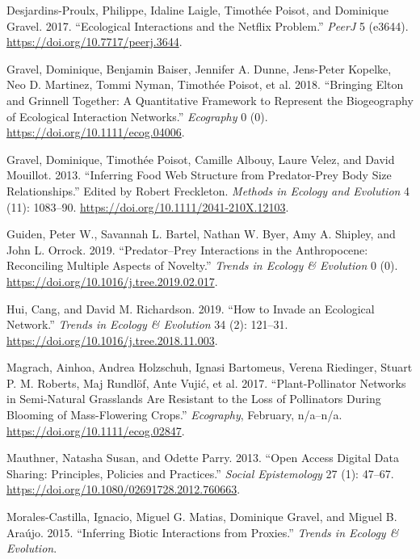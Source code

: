 \leavevmode\hypertarget{ref-DesjLaig17}{}%
Desjardins-Proulx, Philippe, Idaline Laigle, Timothée Poisot, and
Dominique Gravel. 2017. ``Ecological Interactions and the Netflix
Problem.'' \emph{PeerJ} 5 (e3644).
\url{https://doi.org/10.7717/peerj.3644}.

\leavevmode\hypertarget{ref-GravBais18}{}%
Gravel, Dominique, Benjamin Baiser, Jennifer A. Dunne, Jens-Peter
Kopelke, Neo D. Martinez, Tommi Nyman, Timothée Poisot, et al. 2018.
``Bringing Elton and Grinnell Together: A Quantitative Framework to
Represent the Biogeography of Ecological Interaction Networks.''
\emph{Ecography} 0 (0). \url{https://doi.org/10.1111/ecog.04006}.

\leavevmode\hypertarget{ref-GravPois13}{}%
Gravel, Dominique, Timothée Poisot, Camille Albouy, Laure Velez, and
David Mouillot. 2013. ``Inferring Food Web Structure from Predator-Prey
Body Size Relationships.'' Edited by Robert Freckleton. \emph{Methods in
Ecology and Evolution} 4 (11): 1083--90.
\url{https://doi.org/10.1111/2041-210X.12103}.

\leavevmode\hypertarget{ref-GuidBart19}{}%
Guiden, Peter W., Savannah L. Bartel, Nathan W. Byer, Amy A. Shipley,
and John L. Orrock. 2019. ``Predator--Prey Interactions in the
Anthropocene: Reconciling Multiple Aspects of Novelty.'' \emph{Trends in
Ecology \& Evolution} 0 (0).
\url{https://doi.org/10.1016/j.tree.2019.02.017}.

\leavevmode\hypertarget{ref-HuiRich19}{}%
Hui, Cang, and David M. Richardson. 2019. ``How to Invade an Ecological
Network.'' \emph{Trends in Ecology \& Evolution} 34 (2): 121--31.
\url{https://doi.org/10.1016/j.tree.2018.11.003}.

\leavevmode\hypertarget{ref-MagrHolz17}{}%
Magrach, Ainhoa, Andrea Holzschuh, Ignasi Bartomeus, Verena Riedinger,
Stuart P. M. Roberts, Maj Rundlöf, Ante Vujić, et al. 2017.
``Plant-Pollinator Networks in Semi-Natural Grasslands Are Resistant to
the Loss of Pollinators During Blooming of Mass-Flowering Crops.''
\emph{Ecography}, February, n/a--n/a.
\url{https://doi.org/10.1111/ecog.02847}.

\leavevmode\hypertarget{ref-MautParr13}{}%
Mauthner, Natasha Susan, and Odette Parry. 2013. ``Open Access Digital
Data Sharing: Principles, Policies and Practices.'' \emph{Social
Epistemology} 27 (1): 47--67.
\url{https://doi.org/10.1080/02691728.2012.760663}.

\leavevmode\hypertarget{ref-MoraMati15}{}%
Morales-Castilla, Ignacio, Miguel G. Matias, Dominique Gravel, and
Miguel B. Araújo. 2015. ``Inferring Biotic Interactions from Proxies.''
\emph{Trends in Ecology \& Evolution}.

